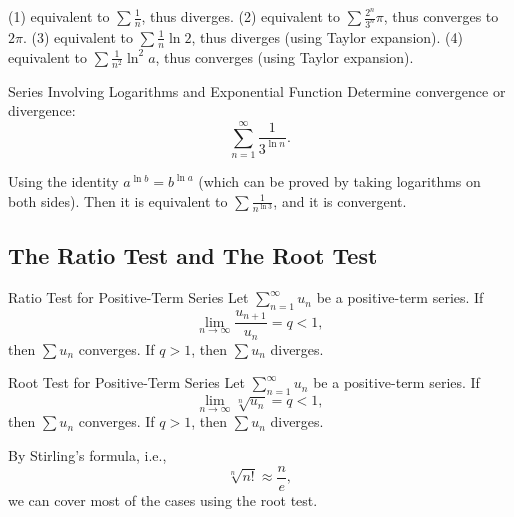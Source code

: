 \begin{solution}
  (1) equivalent to $\sum \frac{1}{n}$, thus diverges.
  (2) equivalent to $\sum \frac{2^n}{3^n}\pi$, thus converges to $2\pi$.
  (3) equivalent to $\sum \frac{1}{n} \ln 2$, thus diverges (using Taylor expansion).
  (4) equivalent to $\sum \frac{1}{n^2} \ln^2 a$, thus converges (using Taylor expansion).
\end{solution}

\begin{example}{Series Involving Logarithms and Exponential Function}{}
  Determine convergence or divergence:
  \begin{equation}
    \sum\limits_{n = 1}^{\infty} \frac{1}{3^{\ln n}}.
  \end{equation}
\end{example}

\begin{solution}
  Using the identity $a^{\ln b} = b^{\ln a}$ (which can be proved by taking
  logarithms on both sides).
  Then it is equivalent to $\sum \frac{1}{n^{\ln 3}}$, and it is convergent.
\end{solution}

\subsection{The Ratio Test and The Root Test}

\begin{theorem}{Ratio Test for Positive-Term Series}{}
  Let $\sum\limits_{n = 1}^{\infty}u_n$ be a positive-term series.
  If
  \begin{equation}
    \lim \limits _{n \rightarrow \infty} \frac{u_{n+1}}{u_n} = q < 1,
  \end{equation}
  then $\sum u_n$ converges. If $q > 1$, then $\sum u_n$ diverges.
\end{theorem}

\begin{theorem}{Root Test for Positive-Term Series}{}
  Let $\sum\limits_{n = 1}^{\infty}u_n$ be a positive-term series.
  If
  \begin{equation}
    \lim \limits _{n \rightarrow \infty} \sqrt[n]{u_n} = q < 1,
  \end{equation}
  then $\sum u_n$ converges. If $q > 1$, then $\sum u_n$ diverges.
\end{theorem}

\begin{note}
  By Stirling's formula, i.e.,
  \begin{equation}
    \sqrt[n]{n!} \approx \frac{n}{e},
  \end{equation}
  we can cover most of the cases using the root test.
\end{note}

